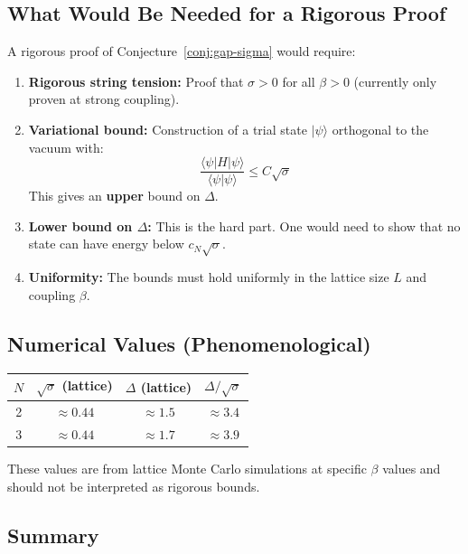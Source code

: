 \subsection{What Would Be Needed for a Rigorous Proof}

A rigorous proof of Conjecture~\ref{conj:gap-sigma} would require:

\begin{enumerate}
    \item \textbf{Rigorous string tension:} Proof that $\sigma > 0$ for all $\beta > 0$ (currently only proven at strong coupling).
    
    \item \textbf{Variational bound:} Construction of a trial state $|\psi\rangle$ orthogonal to the vacuum with:
    \[
    \frac{\langle \psi | H | \psi \rangle}{\langle \psi | \psi \rangle} \leq C \sqrt{\sigma}
    \]
    This gives an \textbf{upper} bound on $\Delta$.
    
    \item \textbf{Lower bound on $\Delta$:} This is the hard part. One would need to show that no state can have energy below $c_N \sqrt{\sigma}$.
    
    \item \textbf{Uniformity:} The bounds must hold uniformly in the lattice size $L$ and coupling $\beta$.
\end{enumerate}

\subsection{Numerical Values (Phenomenological)}

\begin{center}
\begin{tabular}{|c|c|c|c|}
\hline
$N$ & $\sqrt{\sigma}$ (lattice) & $\Delta$ (lattice) & $\Delta/\sqrt{\sigma}$ \\
\hline
2 & $\approx 0.44$ & $\approx 1.5$ & $\approx 3.4$ \\
3 & $\approx 0.44$ & $\approx 1.7$ & $\approx 3.9$ \\
\hline
\end{tabular}
\end{center}

These values are from lattice Monte Carlo simulations at specific $\beta$ values and should not be interpreted as rigorous bounds.

\subsection{Summary}

